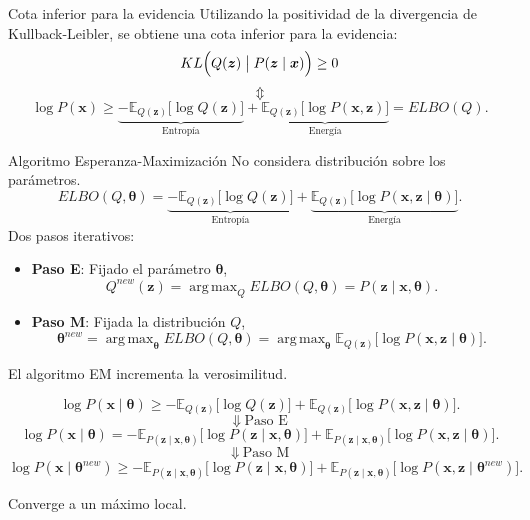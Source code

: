 \documentclass[aspectratio=169]{beamer}
\newcommand{\bx}{\bm{x}}
\newcommand{\bz}{\bm{z}}
\newcommand{\btheta}{\bm{\theta}}
\DeclareMathOperator*{\argmax}{arg\,max}
\newcommand\E[2]{\mathbb{E}_{#1}\Big[#2\Big]}
\newcommand\KL[2]{KL\Big(#1 \bigm| #2\Big)}
\begin{document}
  \begin{frame}{Cota inferior para la evidencia}
    Utilizando la positividad de la divergencia de Kullback-Leibler, se obtiene una cota inferior para la evidencia:
    \[
      \KL{Q(\bz)}{P(\bz \mid \bx)} \geq 0
    \]
    \[
      \Updownarrow
    \]
    \[
      \log P(\bx) \geq \underbrace{- \E{Q(\bz)}{\log Q(\bz)}}_{\text{Entropía}} + \underbrace{\E{Q(\bz)}{\log P(\bx, \bz)}}_{\text{Energía}} = ELBO(Q).
    \]
  \end{frame}


  \begin{frame}{ Algoritmo Esperanza-Maximización}
    No considera distribución sobre los parámetros.
    \[
      ELBO(Q, \btheta) = \underbrace{- \E{Q(\bz)}{\log Q(\bz)}}_{\text{Entropía}} + \underbrace{\E{Q(\bz)}{\log P(\bx, \bz \mid \btheta)}}_{\text{Energía}}.
    \]
    Dos pasos iterativos:
    \begin{itemize}
      \item \textbf{Paso E}: Fijado el parámetro \(\btheta\),
        \[
        Q^{new}(\bz) = \argmax_{Q} ELBO(Q, \btheta) = P(\bz \mid \bx, \btheta).
        \]
      \item \textbf{Paso M}: Fijada la distribución \(Q\),
        \[
        \btheta^{new} = \argmax_{\btheta} ELBO(Q, \btheta) = \argmax_{\btheta} \E{Q(\bz)}{\log P(\bx, \bz \mid \btheta)}.
        \]
    \end{itemize}
  \end{frame}

  \begin{frame}
    \begin{shaded}
      El algoritmo EM incrementa la verosimilitud.
    \end{shaded}
    \[
      \log P(\bx \mid \btheta ) \geq - \E{Q(\bz)}{\log Q(\bz)} + \E{Q(\bz)}{\log P(\bx, \bz \mid \btheta)}.
    \]
    \[
      \Downarrow \ \text{Paso E}
    \]
    \[
      \log P(\bx \mid \btheta ) = - \E{P(\bz \mid \bx, \btheta)}{\log P(\bz \mid \bx, \btheta)} + \E{P(\bz \mid \bx, \btheta)}{\log P(\bx, \bz \mid \btheta)}.
    \]
    \[
      \Downarrow \ \text{Paso M}
    \]
    \[
      \log P(\bx \mid \btheta^{new} ) \geq - \E{P(\bz \mid \bx, \btheta)}{\log P(\bz \mid \bx, \btheta)} + \E{P(\bz \mid \bx, \btheta)}{\log P(\bx, \bz \mid \btheta^{new})}.
    \]
    \begin{shaded}
      Converge a un máximo local.
    \end{shaded}
  \end{frame}
\end{document}
